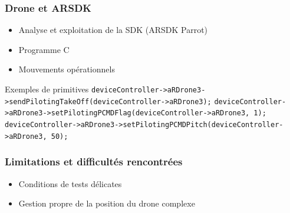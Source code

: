 \begin{frame}
\frametitle{Drone et ARSDK}
\begin{center}
\begin{itemize}
\item Analyse et exploitation de la SDK (ARSDK Parrot)
\item Programme C
\item Mouvements opérationnels
\end{itemize}
\begin{exampleblock}{Exemples de primitives}
{\tiny\verb!deviceController->aRDrone3->sendPilotingTakeOff(deviceController->aRDrone3);!
\verb!deviceController->aRDrone3->setPilotingPCMDFlag(deviceController->aRDrone3, 1);!
\verb!deviceController->aRDrone3->setPilotingPCMDPitch(deviceController->aRDrone3, 50);!}
\end{exampleblock}
\end{center}
\end{frame}

\begin{frame}
\frametitle{Limitations et difficultés rencontrées}
\begin{center}
\begin{itemize}
\item Conditions de tests délicates
\item Gestion propre de la position du drone complexe
\end{itemize}
\end{center}
\end{frame}